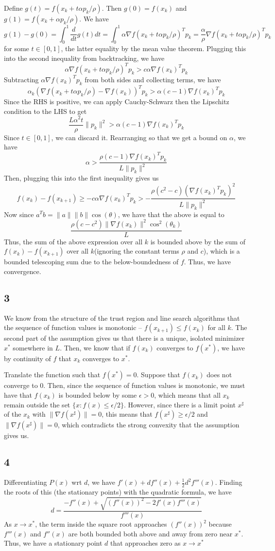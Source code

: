\documentclass{article}
\newcommand{\ep}{\epsilon}
\begin{document}
Define $g(t)=f(x_k+t\alpha p_k/\rho)$. Then $g(0)=f(x_k)$ and $g(1)=f(x_k+\alpha p_k/\rho)$. We have 
\[g(1)-g(0)=\int_0^1\frac{d}{dt}g(t)dt=\int_0^1\alpha\nabla f(x_k+t\alpha p_k/\rho)^Tp_k=\frac{\alpha}{\rho}\nabla f(x_k+t\alpha p_k/\rho)^Tp_k\]
for some $t\in[0,1]$, the latter equality by the mean value theorem. Plugging this into the second inequality from backtracking, we have
\[\alpha\nabla f(x_k+t\alpha p_k/\rho)^Tp_k>c\alpha\nabla f(x_k)^Tp_k\]
Subtracting $\alpha\nabla f(x_k)^Tp_k$ from both sides and collecting terms, we have
\[\alpha_k\left(\nabla f(x_k+t\alpha p_k/\rho)-\nabla f(x_k)\right)^Tp_k>\alpha(c-1)\nabla f(x_k)^Tp_k\]
Since the RHS is positive, we can apply Cauchy-Schwarz then the Lipschitz condition to the LHS to get
\[\frac{L\alpha^2t}{\rho}\|p_k\|^2>\alpha(c-1)\nabla f(x_k)^Tp_k\]
Since $t\in[0,1]$, we can discard it. Rearranging so that we get a bound on $\alpha$, we have 
\[\alpha>\frac{\rho(c-1)\nabla f(x_k)^Tp_k}{L\|p_k\|^2}\]
Then, plugging this into the first inequality gives us
\[f(x_k)-f(x_{k+1})\geq-c\alpha\nabla f(x_k)^Tp_k>-\frac{\rho(c^2-c)\left(\nabla f(x_k)^Tp_k\right)^2}{L\|p_k\|^2}\]
Now since $a^Tb=\|a\|\|b\|\cos(\theta)$, we have that the above is equal to 
\[\frac{\rho(c-c^2)\|\nabla f(x_k)\|^2\cos^2(\theta_k)}{L}\]
Thus, the sum of the above expression over all $k$ is bounded above by the sum of $f(x_k)-f(x_{k+1})$ over all $k$(ignoring the constant terms $\rho$ and $c$), which is a bounded telescoping sum due to the below-boundedness of $f$. Thus, we have convergence.
\subsection*{3}
We know from the structure of the trust region and line search algorithms that the sequence of function values is monotonic -- $f(x_{k+1})\leq f(x_k)$ for all $k$. The second part of the assumption gives us that there is a unique, isolated minimizer $x^*$ somewhere in $L$. Then, we know that if $f(x_k)$ converges to $f(x^*)$, we have by continuity of $f$ that $x_k$ converges to $x^*$.

Translate the function such that $f(x^*)=0$. Suppose that $f(x_k)$ does not converge to $0$. Then, since the sequence of function values is monotonic, we must have that $f(x_k)$ is bounded below by some $\ep>0$, which means that all $x_k$ remain outside the set $\{x: f(x)\leq\ep/2\}$. However, since there is a limit point $x^\sharp$ of the $x_k$ with $\|\nabla f(x^\sharp)\|=0$, this means that $f(x^\sharp)\geq\ep/2$ and $\|\nabla f(x^\sharp)\|=0$, which contradicts the strong convexity that the assumption gives us.
\subsection*{4}
Differentiating $P(x)$ wrt $d$, we have $f'(x)+df''(x)+\frac{1}{2}d^2f'''(x)$. Finding the roots of this (the stationary points) with the quadratic formula, we have 
\[d=\frac{-f''(x)+\sqrt{\left(f''(x)\right)^2-2f'(x)f'''(x)}}{f'''(x)}\]
As $x\to x^*$, the term inside the square root approaches $\left(f''(x)\right)^2$ because $f'''(x)$ and $f''(x)$ are both bounded both above and away from zero near $x^*$. Thus, we have a stationary point $d$ that approaches zero as $x\to x^*$
\end{document}
